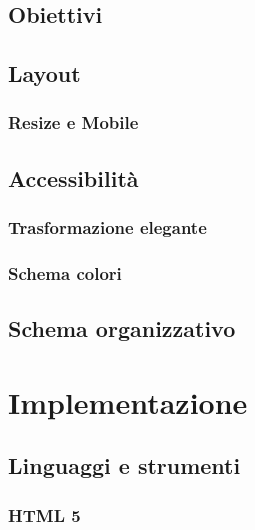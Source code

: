 \documentclass[a4paper]{article}
\begin{document}
		\subsection{Obiettivi}
			
		\subsection{Layout}
			
			\subsubsection{Resize e Mobile}
				
		\subsection{Accessibilità}
		 	
		 	\subsubsection{Trasformazione elegante}
		 		
		 	\subsubsection{Schema colori}
		 		
		\subsection{Schema organizzativo}
			

	\newpage

	\section{Implementazione}
		\subsection{Linguaggi e strumenti}
			
			\subsubsection{HTML 5}
				
\end{document}
